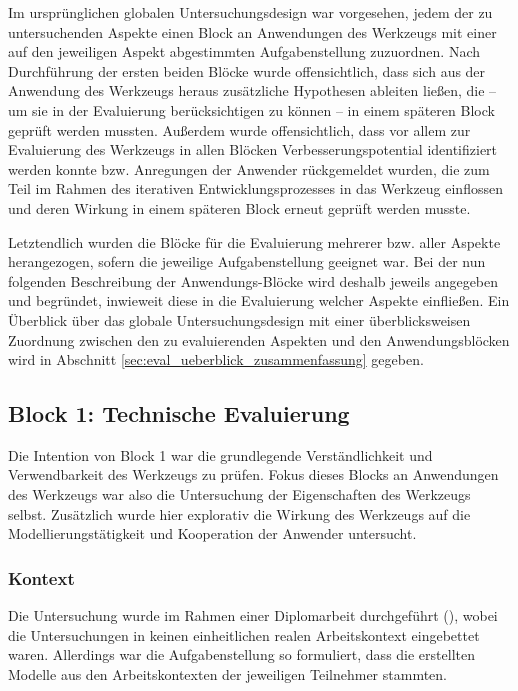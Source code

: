 Im ursprünglichen globalen Untersuchungsdesign war vorgesehen, jedem der zu untersuchenden Aspekte einen Block an Anwendungen des Werkzeugs mit einer auf den jeweiligen Aspekt abgestimmten Aufgabenstellung zuzuordnen. Nach Durchführung der ersten beiden Blöcke wurde offensichtlich, dass sich aus der Anwendung des Werkzeugs heraus zusätzliche Hypothesen ableiten ließen, die -- um sie in der Evaluierung berücksichtigen zu können -- in einem späteren Block geprüft werden mussten. Außerdem wurde offensichtlich, dass vor allem zur Evaluierung des Werkzeugs in allen Blöcken Verbesserungspotential identifiziert werden konnte bzw. Anregungen der Anwender rückgemeldet wurden, die zum Teil im Rahmen des iterativen Entwicklungsprozesses in das Werkzeug einflossen und deren Wirkung in einem späteren Block erneut geprüft werden musste. 

Letztendlich wurden die Blöcke für die Evaluierung mehrerer bzw. aller Aspekte herangezogen, sofern die jeweilige Aufgabenstellung geeignet war. Bei der nun folgenden Beschreibung der Anwendungs-Blöcke wird deshalb jeweils angegeben und begründet, inwieweit diese in die Evaluierung welcher Aspekte einfließen. Ein Überblick über das globale Untersuchungsdesign mit einer überblicksweisen Zuordnung zwischen den zu evaluierenden Aspekten und den Anwendungsblöcken wird in Abschnitt \ref{sec:eval_ueberblick_zusammenfassung} gegeben.

\subsection{Block 1: Technische Evaluierung}
\label{sub:eval_1}

Die Intention von Block 1 war die grundlegende Verständlichkeit und Verwendbarkeit des Werkzeugs zu prüfen. Fokus dieses Blocks an Anwendungen des Werkzeugs war also die Untersuchung der Eigenschaften des Werkzeugs selbst. Zusätzlich wurde hier explorativ die Wirkung des Werkzeugs auf die Modellierungstätigkeit und Kooperation der Anwender untersucht.

\subsubsection{Kontext} %
\label{ssub:1_kontext}

Die Untersuchung wurde im Rahmen einer Diplomarbeit durchgeführt (\cite{Bohninger10}), wobei die Untersuchungen in keinen einheitlichen realen Arbeitskontext eingebettet waren. Allerdings war die Aufgabenstellung so formuliert, dass die erstellten Modelle aus den Arbeitskontexten der jeweiligen Teilnehmer stammten.


